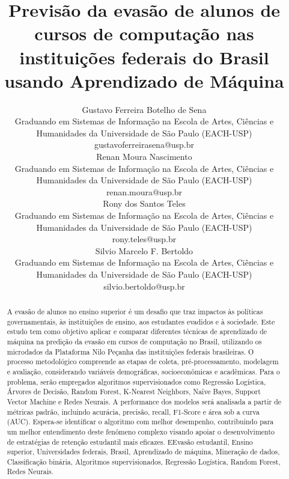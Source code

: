 \documentclass[english, spanish, brazilian]{RBIEarticle} %
\title{Previsão da evasão de alunos de cursos de computação nas instituições federais do Brasil usando Aprendizado de Máquina}
\author{%
	\parbox{8cm}{%
		Gustavo Ferreira Botelho de Sena\\
		Graduando em Sistemas de Informação na Escola de Artes, Ciências e Humanidades da Universidade de São Paulo (EACH-USP) \\
		gustavoferreirasena@usp.br
	}
    \vspace{1cm}
    \quad
	\parbox{8cm}{%
		Renan Moura Nascimento\\
		Graduando em Sistemas de Informação na Escola de Artes, Ciências e Humanidades da Universidade de São Paulo (EACH-USP) \\
		renan.moura@usp.br
	}
        \newline
        \parbox{8cm}{%
		Rony dos Santos Teles\\
		Graduando em Sistemas de Informação na Escola de Artes, Ciências e Humanidades da Universidade de São Paulo (EACH-USP) \\
		rony.teles@usp.br
	}
        \quad
        \vspace{1cm}
        \parbox{8cm}{%
		Silvio Marcelo F. Bertoldo\\
		Graduando em Sistemas de Informação na Escola de Artes, Ciências e Humanidades da Universidade de São Paulo (EACH-USP) \\
		silvio.bertoldo@usp.br
	}
}
\begin{document}
\maketitle

\begin{otherlanguage}{brazilian}
\begin{abstract}
A evasão de alunos no ensino superior é um desafio que traz impactos às políticas governamentais, às instituições de ensino, aos estudantes evadidos e à sociedade. Este estudo tem como objetivo aplicar e comparar diferentes técnicas de aprendizado de máquina na predição da evasão em cursos de computação no Brasil, utilizando os microdados da Plataforma Nilo Peçanha das instituições federais brasileiras. O processo metodológico compreende as etapas de coleta, pré-processamento, modelagem e avaliação, considerando variáveis demográficas, socioeconômicas e acadêmicas. Para o problema, serão empregados algoritmos supervisionados como Regressão Logística, Árvores de Decisão, Random Forest, K-Nearest Neighbors, Naïve Bayes, Support Vector Machine e Redes Neurais. A performance dos modelos será analisada a partir de métricas padrão, incluindo acurácia, precisão, recall, F1-Score e área sob a curva (AUC). Espera-se identificar o algoritmo com melhor desempenho, contribuindo para um melhor entendimento deste fenômeno complexo visando apoiar o desenvolvimento de estratégias de retenção estudantil mais eficazes.
\keywords EEvasão estudantil, Ensino superior, Universidades federais, Brasil, Aprendizado de máquina, Mineração de dados, Classificação binária, Algoritmos supervisionados, Regressão Logística, Random Forest, Redes Neurais.
\end{abstract}
\end{otherlanguage}
\end{document}
